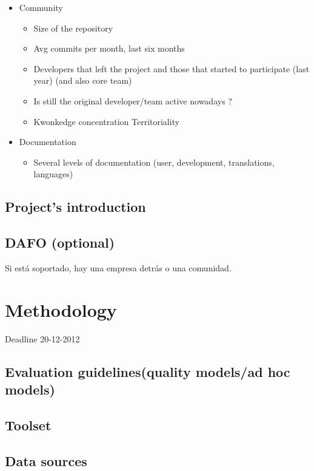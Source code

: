 \documentclass[11pt]{scrartcl}
\begin{document}
\begin{itemize}
    \item Community
        \begin{itemize}
            \item Size of the repository
            \item Avg commits per month, last six months
            \item Developers that left the project and those that started to participate (last year) (and also core team)
            \item Is still the original developer/team active nowadays ?
            \item Kwonkedge concentration Territoriality
        \end{itemize}
    
    \item Documentation
        \begin{itemize}
            \item Several levels of documentation (user, development, translations, languages)
        \end{itemize}
    
\end{itemize}


\subsection{Project's introduction}
\subsection{DAFO (optional)}

Si está soportado, hay una empresa detrás o una comunidad.

\section{Methodology}

Deadline 20-12-2012

\subsection{Evaluation guidelines(quality models/ad hoc models)}
\subsection{Toolset}
\subsection{Data sources}
\end{document}
